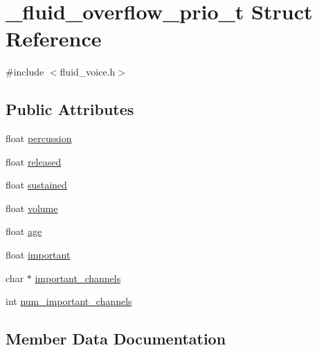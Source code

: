 \hypertarget{struct__fluid__overflow__prio__t}{}\section{\+\_\+fluid\+\_\+overflow\+\_\+prio\+\_\+t Struct Reference}
\label{struct__fluid__overflow__prio__t}


{\ttfamily \#include $<$fluid\+\_\+voice.\+h$>$}

\subsection*{Public Attributes}
\begin{DoxyCompactItemize}
\item 
float \hyperlink{struct__fluid__overflow__prio__t_a1c597217c990a8d32b7d312dfd8418f0}{percussion}
\item 
float \hyperlink{struct__fluid__overflow__prio__t_a85493c7748bafb1bcfd5b4fb81382a7f}{released}
\item 
float \hyperlink{struct__fluid__overflow__prio__t_a16198936689382ef6968ae49efb2d436}{sustained}
\item 
float \hyperlink{struct__fluid__overflow__prio__t_a27b427667522657fc8219c796ed22b60}{volume}
\item 
float \hyperlink{struct__fluid__overflow__prio__t_a0de07e878a7f7e4667ad3417897b0b87}{age}
\item 
float \hyperlink{struct__fluid__overflow__prio__t_afb4380842aa9429afbfd8e3594ed5413}{important}
\item 
char $\ast$ \hyperlink{struct__fluid__overflow__prio__t_ae2c4cffa02815bf1a5619fa258c70348}{important\+\_\+channels}
\item 
int \hyperlink{struct__fluid__overflow__prio__t_a9bf22b15b4349c0ddfd92d08214fc2c9}{num\+\_\+important\+\_\+channels}
\end{DoxyCompactItemize}


\subsection{Member Data Documentation}
\mbox{\label{struct__fluid__overflow__prio__t_a0de07e878a7f7e4667ad3417897b0b87}} 
